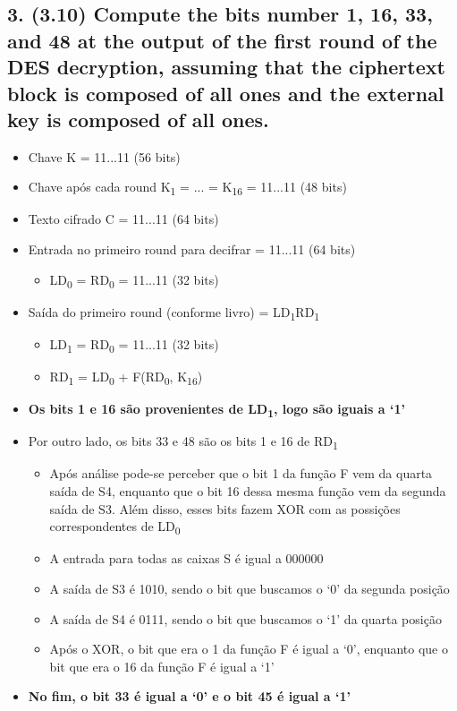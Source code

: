 \documentclass[12pt]{article}
\begin{document}
\subsection*{3. (3.10) Compute the bits number 1, 16, 33, and 48 at the output
of the first round of the DES decryption, assuming that the ciphertext block is
composed of all ones and the external key is composed of all ones.}

  \begin{itemize}
    \item Chave K = 11...11 (56 bits)
    \item Chave após cada round K\textsubscript{1} = ... = K\textsubscript{16} =
    11...11 (48 bits)
    \item Texto cifrado C = 11...11 (64 bits)
    \item Entrada no primeiro round para decifrar = 11...11 (64 bits)
    \begin{itemize}
      \item LD\textsubscript{0} = RD\textsubscript{0} = 11...11 (32 bits)
    \end{itemize}
    \item Saída do primeiro round (conforme livro) =
    LD\textsubscript{1}RD\textsubscript{1}
    \begin{itemize}
      \item LD\textsubscript{1} = RD\textsubscript{0} = 11...11 (32 bits)
      \item RD\textsubscript{1} = LD\textsubscript{0} + F(RD\textsubscript{0},
      K\textsubscript{16})
    \end{itemize}
    \item \textbf{Os bits 1 e 16 são provenientes de LD\textsubscript{1}, logo
    são iguais a `1'}
    \item Por outro lado, os bits 33 e 48 são os bits 1 e 16 de
    RD\textsubscript{1}
    \begin{itemize}
      \item Após análise pode-se perceber que o bit 1 da função F vem da quarta
      saída de S4, enquanto que o bit 16 dessa mesma função vem da segunda saída
      de S3. Além disso, esses bits fazem XOR com as possições correspondentes
      de LD\textsubscript{0}
      \item A entrada para todas as caixas S é igual a 000000
      \item A saída de S3 é 1010, sendo o bit que buscamos o `0' da segunda
      posição
      \item A saída de S4 é 0111, sendo o bit que buscamos o `1' da quarta
      posição
      \item Após o XOR, o bit que era o 1 da função F é igual a `0', enquanto
      que o bit que era o 16 da função F é igual a `1'
    \end{itemize}
    \item \textbf{No fim, o bit 33 é igual a `0' e o bit 45 é igual a `1'}
  \end{itemize}
\end{document}

